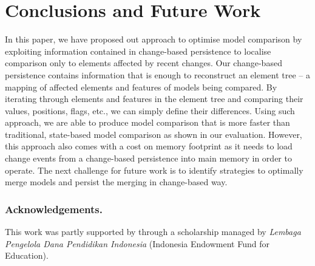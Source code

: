 \documentclass{llncs}
\begin{document}

\section{Conclusions and Future Work}
\label{sec:conclusion_and_future_work}
In this paper, we have proposed out approach to optimise model comparison by exploiting information contained in change-based persistence to localise comparison only to elements affected by recent changes. Our change-based persistence contains information that is enough to reconstruct an element tree -- a mapping of affected elements and features of models being compared. By iterating through elements and features in the element tree and comparing their values, positions, flags, etc., we can simply define their differences. Using such approach, we are able to produce model comparison that is more faster than traditional, state-based model comparison as shown in our evaluation. However, this approach also comes with a cost on memory footprint as it needs to load change events from a change-based persistence into main memory in order to operate. The next challenge for future work is to identify strategies to optimally merge models and persist the merging in change-based way. 

\vspace{-10pt}
\subsubsection*{Acknowledgements.} This work was partly supported by through a scholarship managed by \emph{Lembaga Pengelola Dana Pendidikan Indonesia} (Indonesia Endowment Fund for Education).

 

\end{document}
